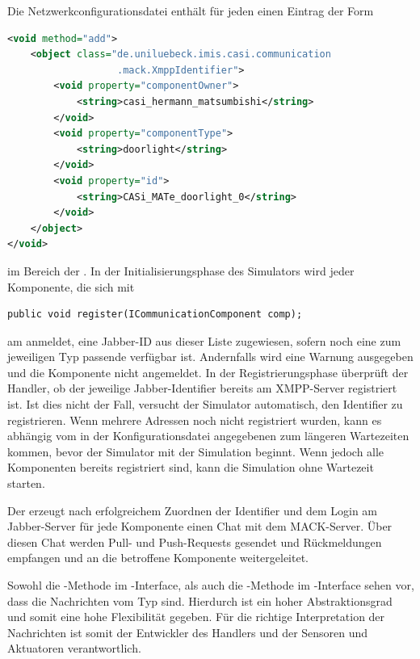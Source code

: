 Die Netzwerkconfigurationsdatei enthält für jeden  einen Eintrag der Form
\begin{illfloat}[H]
\begin{lstlisting}[language=XML]
<void method="add">
	<object class="de.uniluebeck.imis.casi.communication
	               .mack.XmppIdentifier">
		<void property="componentOwner">
			<string>casi_hermann_matsumbishi</string>
		</void>
		<void property="componentType">
			<string>doorlight</string>
		</void>
		<void property="id">
			<string>CASi_MATe_doorlight_0</string>
		</void>
	</object>
</void>
\end{lstlisting}
\end{illfloat}
im Bereich der  . In der Initialisierungsphase des Simulators wird jeder Komponente, die sich mit
\begin{illfloat}[H]
   \begin{lstlisting}
public void register(ICommunicationComponent comp);
   \end{lstlisting}
\end{illfloat}
am  anmeldet, eine Jabber-ID aus dieser Liste zugewiesen, sofern noch eine zum jeweiligen Typ passende verfügbar ist. Andernfalls wird eine Warnung ausgegeben und die Komponente nicht angemeldet.
In der Registrierungsphase überprüft der Handler, ob der jeweilige Jabber-Identifier bereits am XMPP-Server registriert ist. Ist dies nicht der Fall, versucht der Simulator automatisch, den Identifier zu registrieren. Wenn mehrere Adressen noch nicht registriert wurden, kann es abhängig vom in der Konfigurationsdatei angegebenen  zum längeren Wartezeiten kommen, bevor der Simulator mit der Simulation beginnt. Wenn jedoch alle Komponenten bereits registriert sind, kann die Simulation ohne Wartezeit starten.

Der  erzeugt nach erfolgreichem Zuordnen der Identifier und dem Login am Jabber-Server für jede Komponente einen Chat mit dem MACK-Server. Über diesen Chat werden Pull- und Push-Requests gesendet und Rückmeldungen empfangen und an die betroffene Komponente weitergeleitet.

Sowohl die -Methode im -Interface, als auch die -Methode im -Interface sehen vor, dass die Nachrichten vom Typ  sind. Hierdurch ist ein hoher Abstraktionsgrad und somit eine hohe Flexibilität gegeben. Für die richtige Interpretation der Nachrichten ist somit der Entwickler des Handlers und der Sensoren und Aktuatoren verantwortlich.

